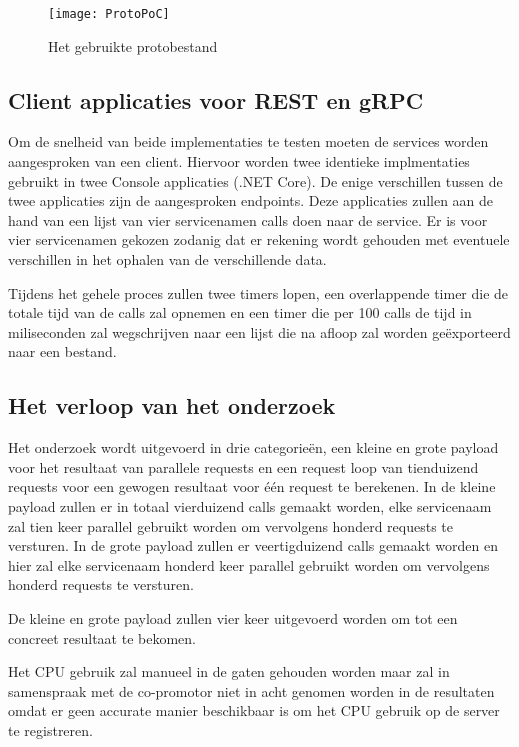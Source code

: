 \begin{figure}[H]
    \centering
    \texttt{[image: ProtoPoC]}
    \caption[Proof-Of-Concept protobestand]{Het gebruikte protobestand}
    \label{fig:ProtoPoC}
\end{figure}

\subsection{Client applicaties voor REST en gRPC}
\label{subsec:Client applicaties voor REST en gRPC}

Om de snelheid van beide implementaties te testen moeten de services worden aangesproken van een client. Hiervoor worden twee identieke implmentaties gebruikt in twee Console applicaties (.NET Core). De enige verschillen tussen de twee applicaties zijn de aangesproken endpoints. Deze applicaties zullen aan de hand van een lijst van vier servicenamen calls doen naar de service. Er is voor vier servicenamen gekozen zodanig dat er rekening wordt gehouden met eventuele verschillen in het ophalen van de verschillende data.

Tijdens het gehele proces zullen twee timers lopen, een overlappende timer die de totale tijd van de calls zal opnemen en een timer die per 100 calls de tijd in miliseconden zal wegschrijven naar een lijst die na afloop zal worden geëxporteerd naar een bestand.

\subsection{Het verloop van het onderzoek}
\label{subsec:Het verloop van het onderzoek}

Het onderzoek wordt uitgevoerd in drie categorieën, een kleine en grote payload voor het resultaat van parallele requests en een request loop van tienduizend requests voor een gewogen resultaat voor één request te berekenen. In de kleine payload zullen er in totaal vierduizend calls gemaakt worden, elke servicenaam zal tien keer parallel gebruikt worden om vervolgens honderd requests te versturen. In de grote payload zullen er veertigduizend calls gemaakt worden en hier zal elke servicenaam honderd keer parallel gebruikt worden om vervolgens honderd requests te versturen.

De kleine en grote payload zullen vier keer uitgevoerd worden om tot een concreet resultaat te bekomen.

Het CPU gebruik zal manueel in de gaten gehouden worden maar zal in samenspraak met de co-promotor niet in acht genomen worden in de resultaten omdat er geen accurate manier beschikbaar is om het CPU gebruik op de server te registreren.

